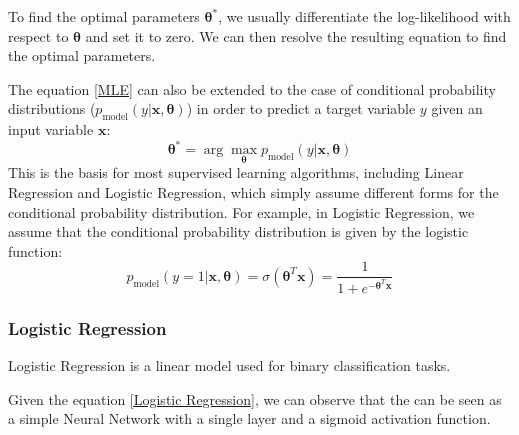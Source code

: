 To find the optimal parameters $\boldsymbol{\theta}^*$, we usually differentiate the log-likelihood with respect to $\boldsymbol{\theta}$ and set it
to zero. We can then resolve the resulting equation to find the optimal parameters.

The equation \ref{MLE} can also be extended to the case of conditional probability distributions ($p_{\text{model}}(y|\boldsymbol{x}, \boldsymbol{\theta})$) in order to predict a target variable $y$ given an input variable $\boldsymbol{x}$:
\begin{equation*}
    \boldsymbol{\theta}^* = \arg\max_{\boldsymbol{\theta}} p_{\text{model}}(y|\boldsymbol{x}, \boldsymbol{\theta})
\end{equation*}
This is the basis for most supervised learning algorithms, including Linear Regression and Logistic Regression, which simply assume different forms for the conditional probability distribution.
For example, in Logistic Regression, we assume that the conditional probability distribution is given by the logistic function:
\begin{equation}
    \label{Logistic Regression}
    p_{\text{model}}(y=1|\boldsymbol{x}, \boldsymbol{\theta}) = \sigma(\boldsymbol{\theta}^T \boldsymbol{x}) = \frac{1}{1 + e^{-\boldsymbol{\theta}^T \boldsymbol{x}}}
\end{equation}

\subsubsection{Logistic Regression}
Logistic Regression is a linear model used for binary classification tasks.

Given the equation \ref{Logistic Regression}, we can observe that the can be seen as a simple Neural Network with a single layer and a sigmoid activation function.